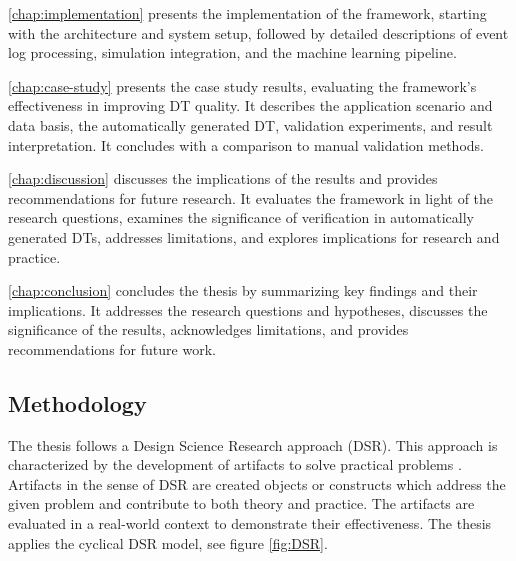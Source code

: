 \autoref{chap:implementation} presents the implementation of the framework, starting with the architecture and system setup, followed by detailed descriptions of event log processing, simulation integration, and the machine learning pipeline.

\autoref{chap:case-study} presents the case study results, evaluating the framework's effectiveness in improving DT quality. It describes the application scenario and data basis, the automatically generated DT, validation experiments, and result interpretation. It concludes with a comparison to manual validation methods.

\autoref{chap:discussion} discusses the implications of the results and provides recommendations for future research. It evaluates the framework in light of the research questions, examines the significance of verification in automatically generated DTs, addresses limitations, and explores implications for research and practice.

\autoref{chap:conclusion} concludes the thesis by summarizing key findings and their implications. It addresses the research questions and hypotheses, discusses the significance of the results, acknowledges limitations, and provides recommendations for future work.

\subsection*{Methodology}

The thesis follows a Design Science Research approach (DSR). This approach is characterized by the development of artifacts to solve practical problems \autocite{hevner2004design,peffers2007design}. Artifacts in the sense of DSR are created objects or constructs which address the given problem and contribute to both theory and practice. The artifacts are evaluated in a real-world context to demonstrate their effectiveness. The thesis applies the cyclical DSR model, see figure \ref{fig:DSR}.

